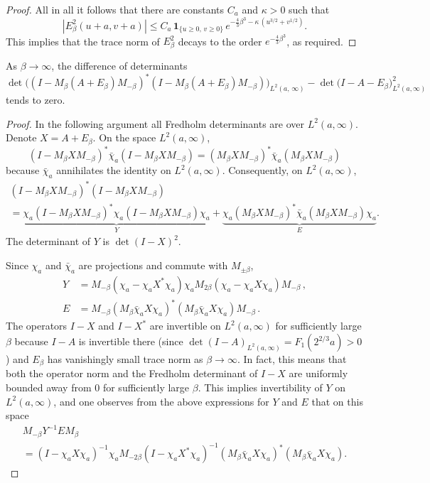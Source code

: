 \documentclass[AHL,Unicode,longabstracts]{cedram}
\newcommand{\ind}[1]{\mathbf{1}_{\{ #1 \}}}
\begin{document}
\begin{proof}
All in all it follows that there are constants $C_a$ and $\kappa > 0$ such that
\[
|E^2_{\beta}(u+a,v+a)| \leq C_a\, \ind{u \geq 0,\, v \geq 0}\, e^{-\frac{4}{3}\beta^3 - \kappa\, (u^{3/2} + v^{1/2})}.
\]
This implies that the trace norm of $E^2_{\beta}$ decays to the order $e^{-\frac{4}{3}\beta^3}$, as required.
\end{proof}

\begin{lemm} \label{lem:error2}
As $\beta \to \infty$, the difference of determinants
\[
\det \Big((I - M_{\beta}(A+ E_{\beta})M_{-\beta})^{*}
(I - M_{\beta}(A+ E_{\beta})M_{-\beta})\Big)_{L^2(a,\, \infty)} -
\det \big (I - A- E_{\beta}\big)_{L^2(a,\infty)}^2
\]
tends to zero.
\end{lemm}

\begin{proof}
In the following argument all Fredholm determinants are over $L^2(a,\infty)$. Denote $X = A + E_{\beta}$. On the space $L^2(a,\infty)$,
\[
(I- M_{\beta}XM_{-\beta})^{*} \bar{\chi}_a (I- M_{\beta}XM_{-\beta}) =
(M_{\beta} X M_{-\beta})^{*} \bar{\chi}_a (M_{\beta}XM_{-\beta})
\]
because $\bar{\chi}_a$ annihilates the identity on $L^2(a,\infty)$. Consequently, on $L^2(a,\infty)$,
\begin{multline*}
(I - M_{\beta}XM_{-\beta})^{*}(I - M_{\beta}XM_{-\beta}) \\
= \underbrace{\chi_a(I - M_{\beta}XM_{-\beta})^{*}\chi_a(I - M_{\beta}XM_{-\beta})\chi_a}_{Y} +
\underbrace{\chi_a(M_{\beta} X M_{-\beta})^{*} \bar{\chi}_a (M_{\beta}XM_{-\beta})\chi_a}_{E}.
\end{multline*}
The determinant of $Y$ is $\det(I-X)^2$.

Since $\chi_a$ and $\bar{\chi}_{a}$ are projections and commute with $M_{\pm \beta}$,
\begin{align*}
Y &= M_{-\beta} (\chi_a - \chi_a X^{*} \chi_a) \chi_a M_{2\beta} (\chi_a - \chi_a X \chi_a) M_{-\beta}\,,\\
E &= M_{-\beta} (M_{\beta}\bar{\chi}_aX\chi_a)^{*} (M_{\beta}\bar{\chi}_aX\chi_a) M_{-\beta}\,.
\end{align*}
The operators $I - X$ and $I - X^{*}$ are invertible on $L^2(a,\infty)$ for sufficiently large $\beta$ because $I-A$ is invertible there (since $\det(I-A)_{L^2(a,\infty)} = F_1(2^{2/3}a) > 0$) and $E_{\beta}$ has vanishingly small trace norm as $\beta \to \infty$. In fact, this means that both the operator norm and the Fredholm determinant of $I - X$ are uniformly bounded away from 0 for sufficiently large $\beta$. This implies invertibility of $Y$ on $L^2(a,\infty)$, and one observes from the above expressions for $Y$ and $E$ that on this space
\begin{multline}\label{eqn:error2a}
M_{-\beta} Y^{-1}E M_{\beta} \\
=(I-\chi_aX\chi_a)^{-1} \chi_a M_{-2\beta}(I-\chi_a X^{*} \chi_a)^{-1} (M_{\beta}\bar{\chi}_aX\chi_a)^{*} (M_{\beta}\bar{\chi}_aX\chi_a).
\end{multline}


\end{proof}
\end{document}
